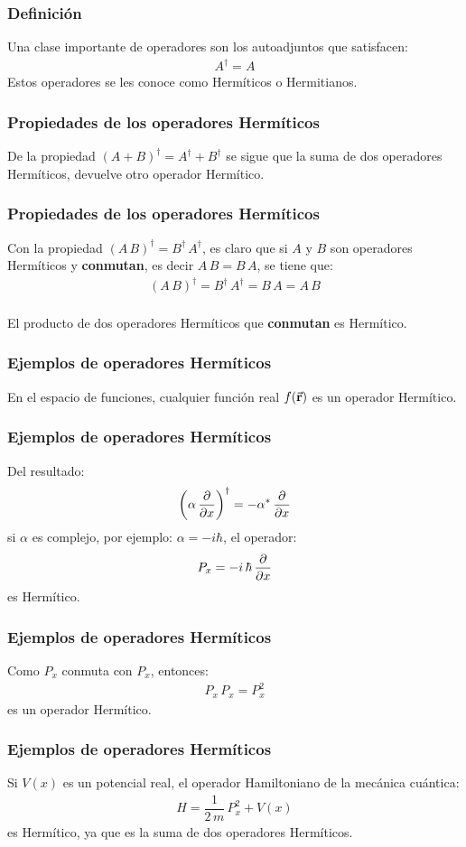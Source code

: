 \documentclass[12pt]{beamer}
\begin{document}
\begin{frame}
\frametitle{Definición}
Una clase importante de operadores son los autoadjuntos que satisfacen:
\pause
\begin{align*}
A^{\dagger} = A
\end{align*}
\pause
Estos operadores se les conoce como Hermíticos o Hermitianos.
\end{frame}
\begin{frame}
\frametitle{Propiedades de los operadores Hermíticos}
De la propiedad $(A + B)^{\dagger} = A^{\dagger} + B^{\dagger}$ se sigue que la suma de dos operadores Hermíticos, devuelve otro operador Hermítico.
\end{frame}
\begin{frame}
\frametitle{Propiedades de los operadores Hermíticos}
Con la propiedad $(A \, B)^{\dagger} = B^{\dagger} \, A^{\dagger}$, es claro que si $A$ y $B$ son operadores Hermíticos y \textbf{conmutan}, es decir $A \, B = B \, A$, se tiene que:
\pause
\begin{align*}
(A \, B)^{\dagger} = B^{\dagger} \, A^{\dagger} = B \, A = A \, B
\end{align*}
\\
\bigskip
\pause
El producto de dos operadores Hermíticos que \textbf{conmutan} es Hermítico.
\end{frame}
\begin{frame}
\frametitle{Ejemplos de operadores Hermíticos}
En el espacio de funciones, cualquier función real $f(\va{r})$ es un operador Hermítico.
\end{frame}
\begin{frame}
\frametitle{Ejemplos de operadores Hermíticos}
Del resultado:
\begin{align*}
\left( \alpha \, \pdv{x} \right)^{\dagger} = - \alpha^{*} \, \pdv{x}
\end{align*}
\pause
si $\alpha$ es complejo, por ejemplo: $\alpha = -i \hbar$, el operador: \pause
\begin{align*}
P_{x} = -i \, \hbar \, \pdv{x}
\end{align*}
es Hermítico.
\end{frame}
\begin{frame}
\frametitle{Ejemplos de operadores Hermíticos}
Como $P_{x}$ conmuta con $P_{x}$, entonces:
\pause
\begin{align*}
P_{x} \, P_{x} = P_{x}^{2}
\end{align*}
es un operador Hermítico.
\end{frame}
\begin{frame}
\frametitle{Ejemplos de operadores Hermíticos}
Si $V(x)$ es un potencial real, el operador Hamiltoniano de la mecánica cuántica:
\pause
\begin{align*}
H = \dfrac{1}{2 \, m} \, P_{x}^{2} + V(x)
\end{align*}
\pause
es Hermítico, ya que es la suma de dos operadores Hermíticos.
\end{frame}
\end{document}
